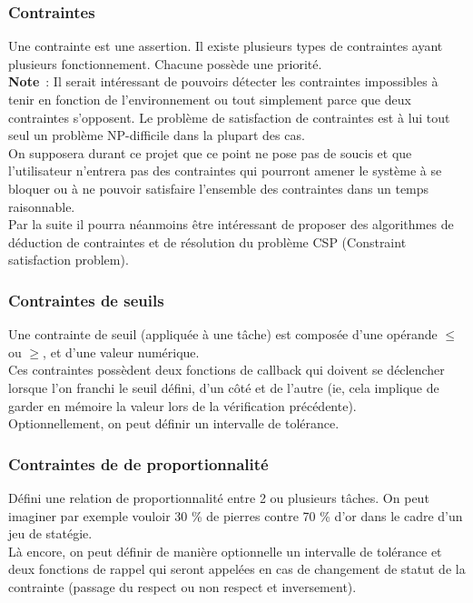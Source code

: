 \subsubsection*{Contraintes}

Une contrainte est une assertion.
Il existe plusieurs types de contraintes ayant plusieurs fonctionnement. Chacune possède une priorité. \\

\textbf{Note}~: Il serait intéressant de pouvoirs détecter les contraintes impossibles à tenir en fonction de l'environnement ou tout simplement parce que deux contraintes s'opposent. Le problème de satisfaction de contraintes est à lui tout seul un problème NP-difficile dans la plupart des cas.\\
\indent On supposera durant ce projet que ce point ne pose pas de soucis et que l'utilisateur n'entrera pas des contraintes qui pourront amener le système à se bloquer ou à ne pouvoir satisfaire l'ensemble des contraintes dans un temps raisonnable.\\
\indent Par la suite il pourra néanmoins être intéressant de proposer des algorithmes de déduction de contraintes et de résolution du problème CSP (Constraint satisfaction problem).

\subsubsection*{Contraintes de seuils}

Une contrainte de seuil (appliquée à une tâche) est composée d'une opérande $\leq$ ou $\geq$, et d'une valeur numérique.\\
\indent Ces contraintes possèdent deux fonctions de callback qui doivent se déclencher lorsque l'on franchi le seuil défini, d'un côté et de l'autre (ie, cela implique de garder en mémoire la valeur lors de la vérification précédente).\\
\indent Optionnellement, on peut définir un intervalle de tolérance.

\subsubsection*{Contraintes de de proportionnalité}

Défini une relation de proportionnalité entre 2 ou plusieurs tâches.
On peut imaginer par exemple vouloir 30 \% de pierres contre 70 \% d'or dans le cadre d'un jeu de statégie.\\
\indent Là encore, on peut définir de manière optionnelle un intervalle de tolérance et deux fonctions de rappel qui seront appelées en cas de changement de statut de la contrainte (passage du respect ou non respect et inversement).

